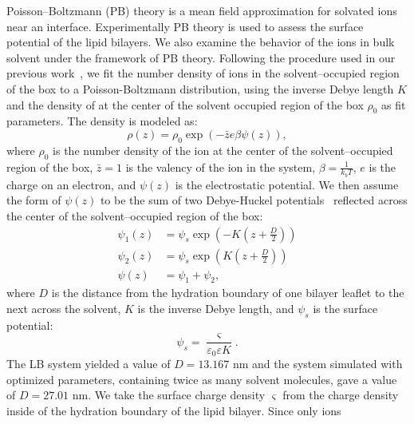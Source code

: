Poisson--Boltzmann (PB) theory is a mean field approximation for
solvated ions near an interface. Experimentally PB theory is used to
assess the surface potential of the lipid bilayers. We also examine
the behavior of the ions in bulk solvent under the framework of PB
theory. Following the procedure used in our previous
work~\cite{saunders:2019}, we fit the number density of \cl ions in
the solvent--occupied region of the box to a Poisson-Boltzmann
distribution, using the inverse Debye length $K$ and the density of
\cl at the center of the solvent occupied region of the box $\rho_0$
as fit parameters. 
The density is modeled as:
\begin{equation}
    \label{eq:gcdens}
    \rho (z)= \rho _{0} \exp{(- \bar{z} e \beta \psi (z))},
\end{equation}
where $\rho_0$ is the number density of the ion at the center of the
solvent--occupied region of the box, $\bar{z}=1$ is the valency of the
ion in the system, $\beta=\frac{1}{k_b T}$, $e$ is the charge on an
electron, and $\psi(z)$ is the electrostatic potential. We then assume
the form of $\psi(z)$ to be the sum of two Debye-Huckel
potentials~\cite{israelachvili:2011:intermol} reflected across the
center of the solvent--occupied region of the box:
\begin{equation}
    \begin{split}
    \psi_1(z)&=\psi_s \exp(-K(z+\frac{D}{2})) \\
    \psi_2(z)&=\psi_s \exp(K(z+\frac{D}{2})) \\
    \psi(z)&=\psi_1 + \psi_2\text{,}
    \label{eq:gcpot}
\end{split}
\end{equation}
where $D$ is the distance from the hydration boundary of one bilayer leaflet
to the next across the solvent, $K$ is the inverse Debye length, and $\psi_s$ is the surface potential:
\begin{equation}
    \psi_s = \frac{\varsigma}{\varepsilon_0\varepsilon K}\text{.}
\label{eq:gcspot}
\end{equation}
The LB system yielded a value of $D=13.167$ nm and the system
simulated with optimized parameters, containing twice as many 
solvent molecules,
gave a value of $D=27.01$ nm.
We take the surface charge density $\varsigma$ from the charge density inside
of the hydration boundary of the lipid bilayer. Since only ions
